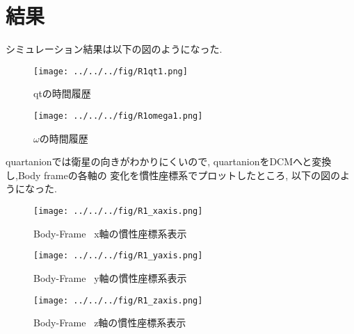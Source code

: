 \documentclass[class=article, crop=false, dvipdfmx, fleqn]{standalone}
\begin{document}
\section{結果}
シミュレーション結果は以下の図のようになった.
\begin{figure}[H]
  \begin{center}
  \texttt{[image: ../../../fig/R1qt1.png]}
  \caption{qtの時間履歴}
\end{center}
\end{figure}

\begin{figure}[H]
  \begin{center}
  \texttt{[image: ../../../fig/R1omega1.png]}
  \caption{$\omega$の時間履歴}
\end{center}
\end{figure}

quartanionでは衛星の向きがわかりにくいので, quartanionをDCMへと変換し,Body frameの各軸の
変化を慣性座標系でプロットしたところ, 以下の図のようになった.

\begin{figure}[H]
  \begin{center}
  \texttt{[image: ../../../fig/R1\_xaxis.png]}
  \caption{Body-Frame \ x軸の慣性座標系表示}
\end{center}
\end{figure}

\begin{figure}[H]
  \begin{center}
  \texttt{[image: ../../../fig/R1\_yaxis.png]}
  \caption{Body-Frame \ y軸の慣性座標系表示}
\end{center}
\end{figure}

\begin{figure}[H]
  \begin{center}
  \texttt{[image: ../../../fig/R1\_zaxis.png]}
  \caption{Body-Frame \ z軸の慣性座標系表示}
\end{center}
\end{figure}
\end{document}
